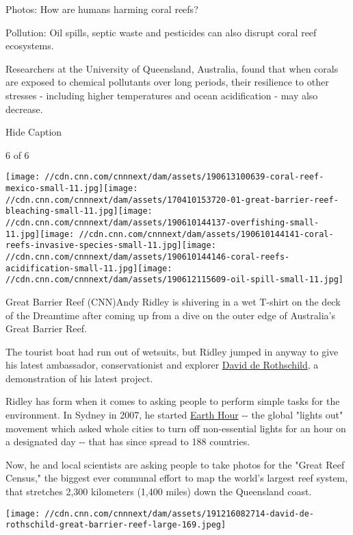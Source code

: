 Photos: How are humans harming coral reefs?

Pollution: Oil spills, septic waste and pesticides can also disrupt
coral reef ecosystems.

Researchers at the University of Queensland, Australia, found that when
corals are exposed to chemical pollutants over long periods, their
resilience to other stresses - including higher temperatures and ocean
acidification - may also decrease.

Hide Caption

6 of 6

\texttt{[image: //cdn.cnn.com/cnnnext/dam/assets/190613100639-coral-reef-mexico-small-11.jpg]}\texttt{[image: //cdn.cnn.com/cnnnext/dam/assets/170410153720-01-great-barrier-reef-bleaching-small-11.jpg]}\texttt{[image: //cdn.cnn.com/cnnnext/dam/assets/190610144137-overfishing-small-11.jpg]}\texttt{[image: //cdn.cnn.com/cnnnext/dam/assets/190610144141-coral-reefs-invasive-species-small-11.jpg]}\texttt{[image: //cdn.cnn.com/cnnnext/dam/assets/190610144146-coral-reefs-acidification-small-11.jpg]}\texttt{[image: //cdn.cnn.com/cnnnext/dam/assets/190612115609-oil-spill-small-11.jpg]}

Great Barrier Reef (CNN)Andy Ridley is shivering in a wet T-shirt on the
deck of the Dreamtime after coming up from a dive on the outer edge of
Australia's Great Barrier Reef.

The tourist boat had run out of wetsuits, but Ridley jumped in anyway to
give his latest ambassador, conservationist and explorer
\href{https://edition.cnn.com/2019/10/08/world/david-de-rothschild-modern-explorers/index.html}{David
de Rothschild}, a demonstration of his latest project.

Ridley has form when it comes to asking people to perform simple tasks
for the environment. In Sydney in 2007, he started
\href{https://edition.cnn.com/2019/03/30/us/earth-hour-explainer-trnd/index.html}{Earth
Hour} -\/- the global "lights out" movement which asked whole cities to
turn off non-essential lights for an hour on a designated day -\/- that
has since spread to 188 countries.

Now, he and local scientists are asking people to take photos for the
"Great Reef Census," the biggest ever communal effort to map the world's
largest reef system, that stretches 2,300 kilometers (1,400 miles) down
the Queensland coast.

\texttt{[image: //cdn.cnn.com/cnnnext/dam/assets/191216082714-david-de-rothschild-great-barrier-reef-large-169.jpeg]}

